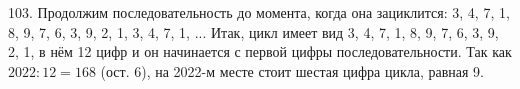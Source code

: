 103. Продолжим последовательность до момента, когда она зациклится:
3, 4, 7, 1, 8, 9, 7, 6, 3, 9, 2, 1, 3, 4, 7, 1, ... Итак, цикл имеет вид
3, 4, 7, 1, 8, 9, 7, 6, 3, 9, 2, 1, в нём 12 цифр и он начинается с первой цифры последовательности. Так как $2022:12=168$ (ост. 6), на 2022-м месте стоит шестая цифра цикла, равная 9.\\
